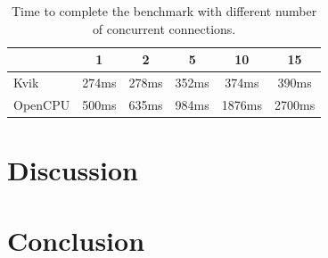 \begin{table}[h]
    \caption[]{Time to complete the benchmark with different number of
    concurrent connections.}
    \begin{tabular}{| l | c | c | c | c | c | }
        \hline 
       & 1 & 2 & 5 & 10 & 15 \\ 
      \hline			
      Kvik & 274ms & 278ms & 352ms & 374ms & 390ms\\
      \hline
      OpenCPU & 500ms & 635ms & 984ms & 1876ms & 2700ms\\
      \hline  
    \end{tabular}
\label{kvikopencpucomparison}
\end{table} 

\section{Discussion}
\section{Conclusion}
